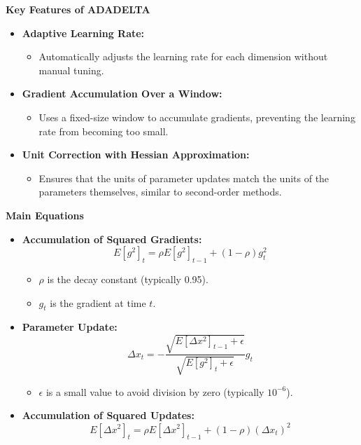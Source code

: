 \documentclass{ieeeojies}
\begin{document}
\textbf{Key Features of ADADELTA}
\begin{itemize}
    \item \textbf{Adaptive Learning Rate:}
    \begin{itemize}
        \item Automatically adjusts the learning rate for each dimension without manual tuning.
    \end{itemize}
    \item \textbf{Gradient Accumulation Over a Window:}
    \begin{itemize}
        \item Uses a fixed-size window to accumulate gradients, preventing the learning rate from becoming too small.
    \end{itemize}
    \item \textbf{Unit Correction with Hessian Approximation:}
    \begin{itemize}
        \item Ensures that the units of parameter updates match the units of the parameters themselves, similar to second-order methods.
    \end{itemize}
\end{itemize}

\textbf{Main Equations}
\begin{itemize}
    \item \textbf{Accumulation of Squared Gradients:}
    \[
    E[g^2]_t = \rho E[g^2]_{t-1} + (1 - \rho) g_t^2
    \]
    \begin{itemize}
        \item \(\rho\) is the decay constant (typically 0.95).
        \item \(g_t\) is the gradient at time \(t\).
    \end{itemize}

    \item \textbf{Parameter Update:}
    \[
    \Delta x_t = - \frac{\sqrt{E[\Delta x^2]_{t-1} + \epsilon}}{\sqrt{E[g^2]_t + \epsilon}} g_t
    \]
    \begin{itemize}
        \item \(\epsilon\) is a small value to avoid division by zero (typically \(10^{-6}\)).
    \end{itemize}

    \item \textbf{Accumulation of Squared Updates:}
    \[
    E[\Delta x^2]_t = \rho E[\Delta x^2]_{t-1} + (1 - \rho) (\Delta x_t)^2
    \]
\end{itemize}
\end{document}
